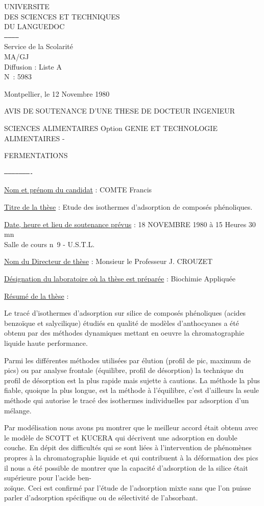 UNIVERSITE\\
DES SCIENCES ET TECHNIQUES\\
DU LANGUEDOC\\
\texttt{------------}\\
Service de la Scolarité\\
MA/GJ\\
Diffusion : Liste A\\
N\textdegree\ : 5983

Montpellier, le 12 Novembre 1980

AVIS DE SOUTENANCE D'UNE THESE DE DOCTEUR INGENIEUR

SCIENCES ALIMENTAIRES Option GENIE ET TECHNOLOGIE ALIMENTAIRES -

FERMENTATIONS

\texttt{----------------------}

\uline{Nom et prénom du candidat} : COMTE Francis

\uline{Titre de la thèse} : Etude des isothermes d'adsorption de composés phénoliques.

\uline{Date, heure et lieu de soutenance prévus} : 18 NOVEMBRE 1980 à 15 Heures 30 mn\\
Salle de cours n\textdegree\ 9 - U.S.T.L.

\uline{Nom du Directeur de thèse} : Monsieur le Professeur J. CROUZET

\uline{Désignation du laboratoire où la thèse est préparée} : Biochimie Appliquée

\uline{Résumé de la thèse} :

Le tracé d'isothermes d'adsorption sur silice de composés phénoliques (acides benzoïque et salycilique) étudiés en qualité de modèles d'anthocyanes a été obtenu par des méthodes dynamiques mettant en oeuvre la chromatographie liquide haute performance.

Parmi les différentes méthodes utilisées par élution (profil de pic, maximum de pics) ou par analyse frontale (équilibre, profil de désorption) la technique du profil de désorption est la plus rapide mais sujette à cautions. La méthode la plus fiable, quoique la plus longue, est la méthode à l'équilibre, c'est d'ailleurs la seule méthode qui autorise le tracé des isothermes individuelles par adsorption d'un mélange.

Par modélisation nous avons pu montrer que le meilleur accord était obtenu avec le modèle de SCOTT et KUCERA qui décrivent une adsorption en double couche.
En dépit des difficultés qui se sont liées à l'intervention de phénomènes propres à la chromatographie liquide et qui contribuent à la déformation des pics il nous a été possible de montrer que la capacité d'adsorption de la silice était supérieure pour l'acide ben-\\
zoïque. Ceci est confirmé par l'étude de l'adsorption mixte sans que l'on puisse parler d'adsorption spécifique ou de sélectivité de l'absorbant.

